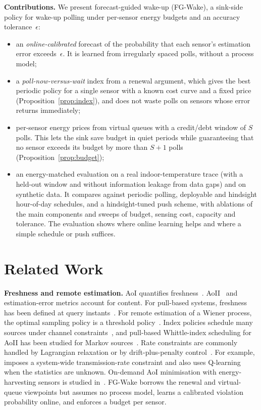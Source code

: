 \documentclass[conference]{IEEEtran}
\begin{document}
\textbf{Contributions.} We present forecast-guided wake-up (FG-Wake), a sink-side policy for wake-up
polling under per-sensor energy budgets and an accuracy tolerance~$\epsilon$:
\begin{itemize}
\item an \emph{online-calibrated} forecast of the probability that each
sensor's estimation error exceeds~$\epsilon$. It is learned from irregularly
spaced polls, without a process model;
\item a \emph{poll-now-versus-wait} index from a renewal argument, which gives
the best periodic policy for a single sensor with a known cost curve and a fixed
price (Proposition~\ref{prop:index}), and does not waste polls on sensors whose error
returns immediately;
\item per-sensor energy prices from virtual queues with a credit/debt window of
$S$ polls. This lets the sink save budget in quiet periods while guaranteeing
that no sensor exceeds its budget by more than $S{+}1$ polls
(Proposition~\ref{prop:budget});
\item an energy-matched evaluation on a real indoor-temperature trace (with a
held-out window and without information leakage from data gaps) and on synthetic
data. It compares against periodic polling, deployable and hindsight hour-of-day
schedules, and a hindsight-tuned push scheme, with ablations of the main
components and sweeps of budget, sensing cost, capacity and tolerance. The
evaluation shows where online learning helps and where a simple schedule or push
suffices.
\end{itemize}

\section{Related Work}\label{sec:related}
\textbf{Freshness and remote estimation.} AoI quantifies
freshness~\cite{kaul2012,yates2021}. AoII~\cite{maatouk2020aoii} and
estimation-error metrics account for content. For pull-based systems, freshness
has been defined at query instants~\cite{chiariotti2022qaoi}. For remote
estimation of a Wiener process, the optimal sampling policy is a threshold
policy~\cite{sun2020wiener}. Index policies schedule many sources under channel
constraints~\cite{kadota2018,ornee2023whittle}, and pull-based Whittle-index
scheduling for AoII has been studied for Markov sources~\cite{kriouile2023pull}.
Rate constraints are commonly handled by Lagrangian relaxation or by
drift-plus-penalty control~\cite{neely2010}. For example, \cite{luo2025}
imposes a system-wide transmission-rate constraint and also uses Q-learning
when the statistics are unknown. On-demand AoI minimisation with
energy-harvesting sensors is studied in~\cite{hatami2022}. FG-Wake borrows the
renewal and virtual-queue viewpoints but assumes no process model, learns a
calibrated violation probability online, and enforces a budget per sensor.
\end{document}
